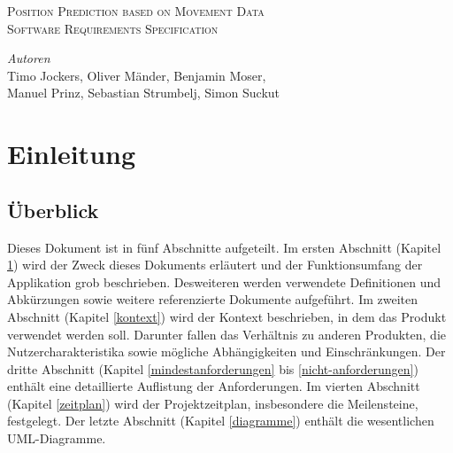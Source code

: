 \documentclass[12pt]{article} %
\begin{document}

\begin{titlepage}

\newcommand{\HRule}{\rule{\linewidth}{0.5mm}} %

\center %

\textsc{\Large Position Prediction based on Movement Data}\\[0.5cm] %
\textsc{\large Software Requirements Specification}\\[0.5cm] %

\vfill

\emph{Autoren}\\
Timo Jockers, Oliver Mänder, Benjamin Moser,\\Manuel Prinz, Sebastian Strumbelj, Simon Suckut

\vfill %

\end{titlepage}


\tableofcontents %

\newpage


\section{Einleitung} \label{einleitung}


\subsection{Überblick}

Dieses Dokument ist in fünf Abschnitte aufgeteilt. Im ersten Abschnitt (Kapitel \ref{einleitung}) wird der Zweck dieses Dokuments erläutert und der Funktionsumfang der Applikation grob beschrieben. Desweiteren werden verwendete Definitionen und Abkürzungen sowie weitere referenzierte Dokumente aufgeführt. Im zweiten Abschnitt (Kapitel \ref{kontext}) wird der Kontext beschrieben, in dem das Produkt verwendet werden soll. Darunter fallen das Verhältnis zu anderen Produkten, die Nutzercharakteristika sowie mögliche Abhängigkeiten und Einschränkungen.
Der dritte Abschnitt (Kapitel \ref{mindestanforderungen} bis \ref{nicht-anforderungen}) enthält eine detaillierte Auflistung der Anforderungen. Im vierten Abschnitt (Kapitel \ref{zeitplan}) wird der Projektzeitplan, insbesondere die Meilensteine, festgelegt. Der letzte Abschnitt (Kapitel \ref{diagramme}) enthält die wesentlichen UML-Diagramme.
\end{document}
